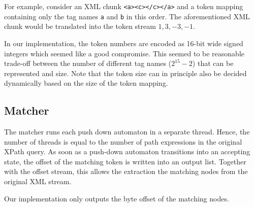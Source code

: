 For example, consider an XML chunk \verb;<a><c></c></a>; and a token mapping
containing only the tag names \verb;a; and \verb;b; in this order. The
aforementioned XML chunk would be translated into the token stream $1, 3, -3,
-1$.

In our implementation, the token numbers are encoded as 16-bit wide signed
integers which seemed like a good compromise. This seemed to be reasonable
trade-off between the number of different tag names ($2^15-2$) that can be
represented and size. Note that the token size can in principle also be decided
dynamically based on the size of the token mapping.

\subsection{Matcher}

The matcher runs each push down automaton in a separate thread. Hence, the
number of threads is equal to the number of path expressions in the original
XPath query. As soon as a push-down automaton transitions into an accepting
state, the offset of the matching token is written into an output list.
Together with the offset stream, this allows the extraction the matching nodes
from the original XML stream.

Our implementation only outputs the byte offset of the matching nodes.



